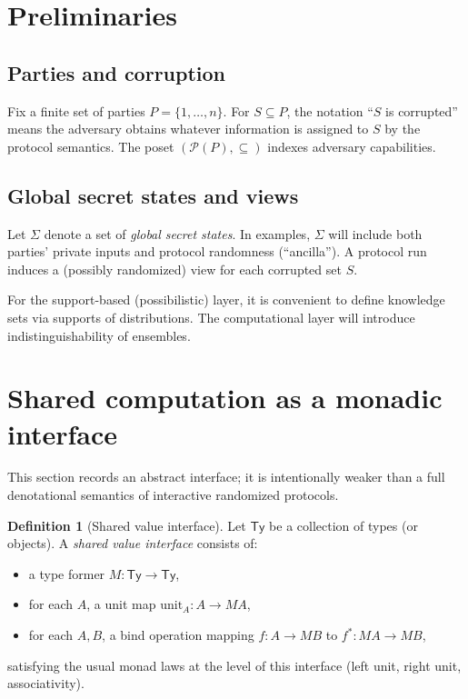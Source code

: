 \documentclass[11pt,a4paper]{article}
\theoremstyle{definition}
\newtheorem{definition}[theorem]{Definition}
\theoremstyle{remark}
\newcommand{\Parties}{P}
\newcommand{\Pow}{\mathcal{P}}
\begin{document}
\section{Preliminaries}
\label{sec:preliminaries}

\subsection{Parties and corruption}
Fix a finite set of parties \(\Parties = \{1,\dots,n\}\). For \(S \subseteq \Parties\), the notation ``\(S\) is corrupted'' means the adversary obtains whatever information is assigned to \(S\) by the protocol semantics. The poset \((\Pow(\Parties), \subseteq)\) indexes adversary capabilities.

\subsection{Global secret states and views}
Let \(\Sigma\) denote a set of \emph{global secret states}. In examples, \(\Sigma\) will include both parties' private inputs and protocol randomness (``ancilla''). A protocol run induces a (possibly randomized) view for each corrupted set \(S\).

For the support-based (possibilistic) layer, it is convenient to define knowledge sets via supports of distributions. The computational layer will introduce indistinguishability of ensembles.

\section{Shared computation as a monadic interface}
\label{sec:mpc-monad}

This section records an abstract interface; it is intentionally weaker than a full denotational semantics of interactive randomized protocols.

\begin{definition}[Shared value interface]
\label{def:shared-interface}
Let \(\mathsf{Ty}\) be a collection of types (or objects). A \emph{shared value interface} consists of:
\begin{itemize}[leftmargin=2em]
  \item a type former \(M : \mathsf{Ty} \to \mathsf{Ty}\),
  \item for each \(A\), a unit map \(\mathrm{unit}_A : A \to M A\),
  \item for each \(A,B\), a bind operation mapping \(f : A \to M B\) to \(f^\ast : M A \to M B\),
\end{itemize}
satisfying the usual monad laws at the level of this interface (left unit, right unit, associativity).
\end{definition}
\end{document}
